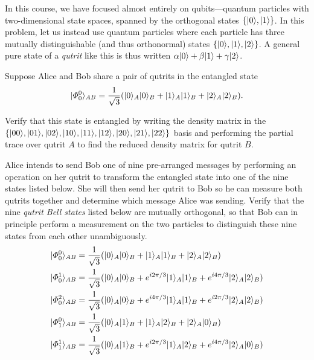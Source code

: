 \documentclass{../phys084}
\begin{document}
\begin {exercise}
  In this course, we have focused almost entirely on qubits---quantum
  particles with two-dimensional state spaces, spanned by the
  orthogonal states \(\{\lvert0\rangle, \lvert1\rangle\}\).  In this problem, let
  us instead use quantum particles where each particle has three
  mutually distinguishable (and thus orthonormal) states
  \(\{\lvert0\rangle, \lvert1\rangle, \lvert2\rangle\}\).  A general pure state of a
  \textit{qutrit} like this is thus written
  \(\alpha \lvert0\rangle + \beta \lvert1\rangle + \gamma \lvert2\rangle\).

  Suppose Alice and Bob share a pair of qutrits in the entangled state
  \[
    \ket {\Phi^0_0}_{AB}
    = \frac 1 {\sqrt 3}
    \prn* {\ket 0_A \ket 0_B + \ket 1_A \ket 1_B + \ket 2_A \ket 2_B}.
  \]

  \begin {problems}
  \item Verify that this state is entangled by writing the density
    matrix in the
    \(\{\lvert00\rangle, \lvert01\rangle, \lvert02\rangle, \lvert10\rangle, \lvert11\rangle,
      \lvert12\rangle, \lvert20\rangle, \lvert21\rangle, \lvert22\rangle\}\) basis and
    performing the partial trace over qutrit \(A\) to find the reduced
    density matrix for qutrit \(B\).
  \item
    \label{itm:nine}
    Alice intends to send Bob one of nine pre-arranged messages by
    performing an operation on her qutrit to transform the entangled
    state into one of the nine states listed below.  She will then
    send her qutrit to Bob so he can measure both qutrits together and
    determine which message Alice was sending.  Verify that the nine
    \textit{qutrit Bell states} listed below are mutually orthogonal,
    so that Bob can in principle perform a measurement on the two
    particles to distinguish these nine states from each other
    unambiguously.  \newcommand {\kk} [2] {\ket {#1}_A \ket {#2}_B}
    \begin {align*}
      \ket {\Phi^0_0}_{AB} &= \frac 1 {\sqrt 3}
      (\kk 0 0 + \kk 1 1 + \kk 2 2) \\
      \ket {\Phi^1_0}_{AB} &= \frac 1 {\sqrt 3}
      (\kk 0 0 + e^{i2\pi/3} \kk 1 1 + e^{i4\pi/3} \kk 2 2) \\
      \ket {\Phi^2_0}_{AB} &= \frac 1 {\sqrt 3}
      (\kk 0 0 + e^{i4\pi/3} \kk 1 1 + e^{i2\pi/3} \kk 2 2) \\
      \ket {\Phi^0_1}_{AB} &= \frac 1 {\sqrt 3}
      (\kk 0 1 + \kk 1 2 + \kk 2 0) \\
      \ket {\Phi^1_1}_{AB} &= \frac 1 {\sqrt 3}
      (\kk 0 1 + e^{i2\pi/3} \kk 1 2 + e^{i4\pi/3} \kk 2 0) \\

\end{align*}
\end{problems}
\end{exercise}
\end{document}
